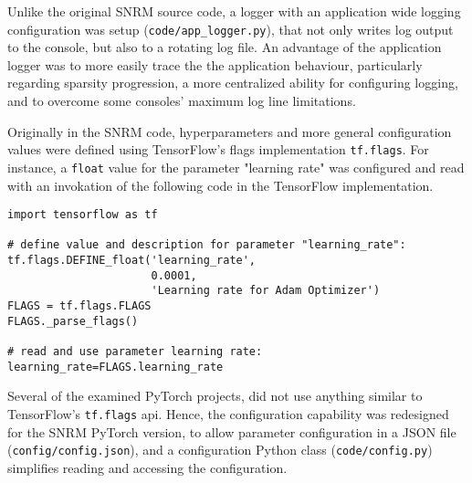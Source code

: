 Unlike the original SNRM source code, a logger with an application wide logging 
    configuration was setup (\texttt{code/app\_logger.py}),
    that not only writes log output to the console, but also to a rotating log file.
An advantage of the application logger was to more easily trace the the application behaviour,
    particularly regarding sparsity progression, a more centralized ability for configuring logging,
    and to overcome some consoles' maximum log line limitations.

Originally in the SNRM code, hyperparameters and more general configuration values were defined using
    TensorFlow's flags implementation \texttt{tf.flags}.
For instance, a \texttt{float} value for the parameter "learning rate" was configured and read with an 
    invokation of the following code in the TensorFlow implementation.
\begin{verbatim}
import tensorflow as tf

# define value and description for parameter "learning_rate":
tf.flags.DEFINE_float('learning_rate', 
                      0.0001, 
                      'Learning rate for Adam Optimizer')
FLAGS = tf.flags.FLAGS
FLAGS._parse_flags()

# read and use parameter learning rate:
learning_rate=FLAGS.learning_rate
\end{verbatim}

Several of the examined PyTorch projects, did not use anything similar to TensorFlow's
    \texttt{tf.flags} api.
Hence, the configuration capability was redesigned for the SNRM PyTorch version,
    to allow parameter configuration in a JSON file (\texttt{config/config.json}),
    and a configuration Python class (\texttt{code/config.py}) simplifies
    reading and accessing the configuration.

